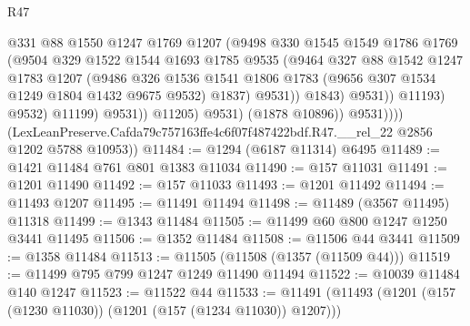 \begin{lexlean}{R47}
\begin{coremodule}
                                  @331
                                  @88
                                  @1550
                                  @1247
                                  @1769
                                  @1207
                                  (@9498
                                    @330
                                    @1545
                                    @1549
                                    @1786
                                    @1769
                                    (@9504
                                      @329
                                      @1522
                                      @1544
                                      @1693
                                      @1785
                                      @9535
                                      (@9464
                                        @327
                                        @88
                                        @1542
                                        @1247
                                        @1783
                                        @1207
                                        (@9486
                                          @326
                                          @1536
                                          @1541
                                          @1806
                                          @1783
                                          (@9656 @307 @1534 @1249 @1804 @1432 @9675 @9532)
                                          @1837)
                                        @9531))
                                    @1843)
                                  @9531))
                              @11193)
                            @9532)
                          @11199)
                        @9531))
                    @11205)
                  @9531)
                (@1878 @10896))
              @9531))))
      (LexLeanPreserve.Cafda79c757163ffe4c6f07f487422bdf.R47.__rel_22 @2856 @1202 @5788 @10953))
@11484 := @1294 (@6187 @11314) @6495
@11489 := @1421 @11484 @761 @801 @1383 @11034
@11490 := @157 @11031
@11491 := @1201 @11490
@11492 := @157 @11033
@11493 := @1201 @11492
@11494 := @11493 @1207
@11495 := @11491 @11494
@11498 := @11489 (@3567 @11495) @11318
@11499 := @1343 @11484
@11505 := @11499 @60 @800 @1247 @1250 @3441 @11495
@11506 := @1352 @11484
@11508 := @11506 @44 @3441
@11509 := @1358 @11484
@11513 := @11505 (@11508 (@1357 (@11509 @44)))
@11519 := @11499 @795 @799 @1247 @1249 @11490 @11494
@11522 := @10039 @11484 @140 @1247
@11523 := @11522 @44
@11533 := @11491 (@11493 (@1201 (@157 (@1230 @11030)) (@1201 (@157 (@1234 @11030)) @1207)))

\end{coremodule}
\end{lexlean}
